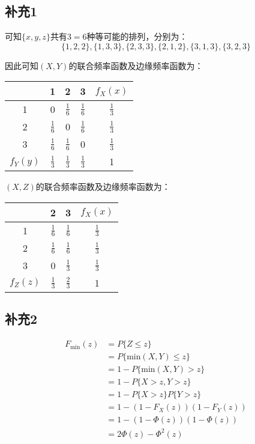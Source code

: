 \documentclass[a4paper,12pt]{ctexart}
\begin{document}
\subsection*{补充1}

可知$\{x,y,z\}$共有$3=6$种等可能的排列，分别为：
\begin{equation*}
	\{1,2,2\}, \{1,3,3\}, \{2,3,3\}, \{2,1,2\}, \{3,1,3\}, \{3,2,3\}
\end{equation*}

因此可知$(X,Y)$的联合频率函数及边缘频率函数为：
\begin{center}
	\begin{tabular}{c|ccc|c}
		\diagbox{$X$}{$Y$} & 1 & 2 & 3 & $f_X(x)$ \\
		\hline
		1 & 0 & $\frac{1}{6}$ & $\frac{1}{6}$ & $\frac{1}{3}$ \\
		2 & $\frac{1}{6}$ & 0 & $\frac{1}{6}$ & $\frac{1}{3}$ \\
		3 & $\frac{1}{6}$ & $\frac{1}{6}$ & 0 & $\frac{1}{3}$ \\
		\hline
		$f_Y(y)$ & $\frac{1}{3}$ & $\frac{1}{3}$ & $\frac{1}{3}$ & 1
	\end{tabular}
\end{center}

$(X,Z)$的联合频率函数及边缘频率函数为：
\begin{center}
	\begin{tabular}{c|cc|c}
		\diagbox{$X$}{$Z$} & 2 & 3 & $f_X(x)$ \\
		\hline
		1 & $\frac{1}{6}$ & $\frac{1}{6}$ & $\frac{1}{3}$ \\
		2 & $\frac{1}{6}$ & $\frac{1}{6}$ & $\frac{1}{3}$ \\
		3 & 0 & $\frac{1}{3}$ & $\frac{1}{3}$ \\
		\hline
		$f_Z(z)$ & $\frac{1}{3}$ & $\frac{2}{3}$ & 1
	\end{tabular}
\end{center}

\subsection*{补充2}

\begin{align*}
	F_{\text{min}}(z) &= P\{Z \leq z\} \\
	&= P\{\text{min}(X,Y) \leq z\} \\
	&= 1 - P\{\text{min}(X,Y) > z\} \\
	&= 1 - P\{X > z, Y > z\} \\
	&= 1 - P\{X > z\} P\{Y > z\} \\
	&= 1 - (1 - F_X(z))(1 - F_Y(z)) \\
	&= 1 - (1 - \Phi(z))(1 - \Phi(z)) \\
	&= 2\Phi(z) - \Phi^2(z)
\end{align*}
\end{document}
